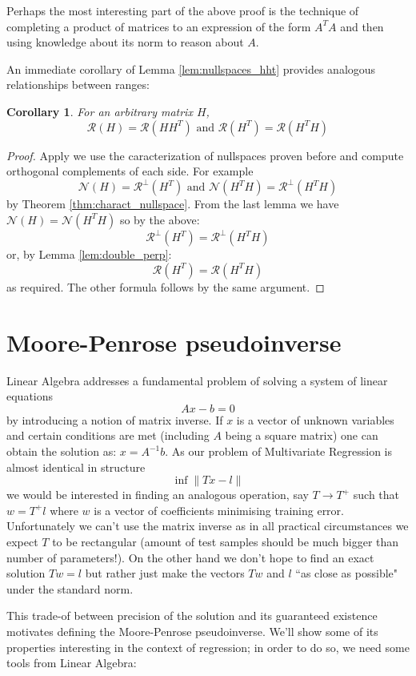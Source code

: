 \documentclass[a4paper]{article}
\theoremstyle{break}
\newtheorem{corollary}{Corollary}[theorem]
\newcommand{\Nu}{\mathcal{N}}
\newcommand{\Ra}{\mathcal{R}}
\begin{document}
Perhaps the most interesting part of the above proof is the technique of completing a product of matrices to an expression of the form $A^T A$ and then using knowledge about its norm to reason about $A$.

An immediate corollary of Lemma \ref{lem:nullspaces_hht} provides analogous relationships between ranges:

\begin{corollary}
    For an arbitrary matrix $H$,
    $$\Ra(H) = \Ra(H H^T) \text{ and } \Ra(H^T) = \Ra(H^T H)$$
\end{corollary}

\begin{proof}
    Apply we use the caracterization of nullspaces proven before and compute orthogonal complements of each side. For example
    $$ \Nu(H) = \Ra^\perp (H^T) \text{ and } \Nu(H^T H) = \Ra^\perp ( H^T H )$$
    by Theorem \ref{thm:charact_nullspace}. From the last lemma we have
    $ \Nu(H) = \Nu(H^T H) $ so by the above:
    $$ \Ra^\perp (H^T) = \Ra^\perp ( H^T H ) $$
    or, by Lemma \ref{lem:double_perp}:
    $$ \Ra (H^T) = \Ra( H^T H ) $$
    as required. The other formula follows by the same argument.
\end{proof}


\section{Moore-Penrose pseudoinverse}
Linear Algebra addresses a fundamental problem of solving a system of linear equations
$$ A x - b = 0$$
by introducing a notion of matrix inverse. If $x$ is a vector of unknown variables and certain conditions are met (including $A$ being a square matrix) one can obtain the solution as: $ x = A^{-1} b $. As our problem of Multivariate Regression is almost identical in structure
$$ \inf \| T x - l \| $$
we would be interested in finding an analogous operation, say $ T \to T^+$ such that $ w = T^+ l$ where $w$ is a vector of coefficients minimising training error. Unfortunately we can't use the matrix inverse as in all practical circumstances we expect $T$ to be rectangular (amount of test samples should be much bigger than number of parameters!). On the other hand we don't hope to find an exact solution $ T w = l$ but rather just make the vectors $T w$ and $l$ ``as close as possible" under the standard norm.

This trade-of between precision of the solution and its guaranteed existence motivates defining the Moore-Penrose pseudoinverse. We'll show some of its properties interesting in the context of regression; in order to do so, we need some tools from Linear Algebra: 
\end{document}
